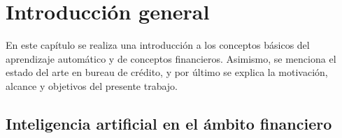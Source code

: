 
\chapter{Introducción general} %

\label{Chapter1} %
\label{IntroGeneral}



\newcommand{\keyword}[1]{\textbf{#1}}
\newcommand{\tabhead}[1]{\textbf{#1}}
\newcommand{\code}[1]{\texttt{#1}}
\newcommand{\file}[1]{\texttt{\bfseries#1}}
\newcommand{\option}[1]{\texttt{\itshape#1}}
\newcommand{\grados}{$^{\circ}$}


En este capítulo se realiza una introducción a los conceptos básicos del aprendizaje automático y de conceptos financieros. Asimismo, se menciona el estado del arte en bureau de crédito, y por último se explica la motivación, alcance y objetivos del presente trabajo.  
\section{Inteligencia artificial en el ámbito financiero}

